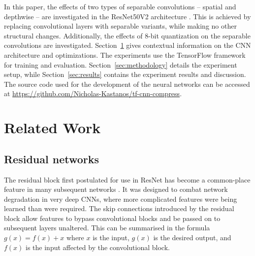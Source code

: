 \documentclass{article}
\begin{document}
	In this paper, the effects of two types of separable convolutions -- spatial and depthwise -- are investigated in the ResNet50V2 architecture \cite{resnetv2}. This is achieved by replacing convolutional layers with separable variants, while making no other structural changes. Additionally, the effects of 8-bit quantization on the separable convolutions are investigated. Section~\ref{sec:background} gives contextual information on the CNN architecture and optimizations. The experiments use the TensorFlow framework \cite{tensorflow2015-whitepaper} for training and evaluation. Section~\ref{sec:methodology} details the experiment setup, while Section~\ref{sec:results} contains the experiment results and discussion. The source code used for the development of the neural networks can be accessed at \url{https://github.com/Nicholas-Kastanos/tf-cnn-compress}.
		
	
	\section{Related Work}
	\label{sec:background}
	\subsection{Residual networks}
	
	The residual block first postulated for use in ResNet has become a common-place feature in many subsequent networks \cite{resnetv1,inception,densenet}. It was designed to combat network degradation in very deep CNNs, where more complicated features were being learned than were required. The skip connections introduced by the residual block allow features to bypass convolutional blocks and be passed on to subsequent layers unaltered. This can be summarised in the formula $g(x) = f(x) + x$ where $x$ is the input, $g(x)$ is the desired output, and $f(x)$ is the input affected by the convolutional block.
	
\end{document}
